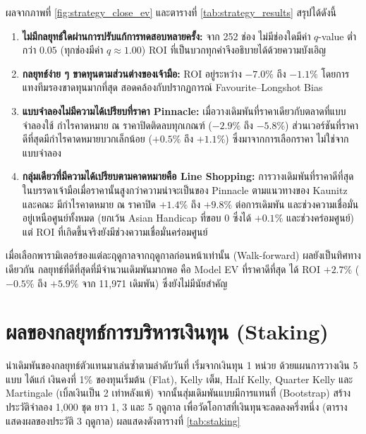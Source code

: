 ผลจากภาพที่ \ref{fig:strategy_close_ev} และตารางที่ \ref{tab:strategy_results} สรุปได้ดังนี้
\begin{enumerate}[label=\arabic*)]
    \item \textbf{ไม่มีกลยุทธ์ใดผ่านการปรับแก้การทดสอบหลายครั้ง:} จาก 252 ช่อง ไม่มีช่องใดมีค่า $q$-value ต่ำกว่า $0.05$ (ทุกช่องมีค่า $q \approx 1.00$) ROI ที่เป็นบวกทุกค่าจึงอธิบายได้ด้วยความบังเอิญ
    \item \textbf{กลยุทธ์ง่าย ๆ ขาดทุนตามส่วนต่างของเจ้ามือ:} ROI อยู่ระหว่าง $-7.0\%$ ถึง $-1.1\%$ โดยการแทงทีมรองขาดทุนมากที่สุด สอดคล้องกับปรากฏการณ์ Favourite--Longshot Bias
    \item \textbf{แบบจำลองไม่มีความได้เปรียบที่ราคา Pinnacle:} เมื่อวางเดิมพันที่ราคาเดียวกับตลาดที่แบบจำลองใช้ กำไรคาดหมาย ณ ราคาปิดติดลบทุกเกณฑ์ ($-2.9\%$ ถึง $-5.8\%$) ส่วนเวอร์ชันที่ราคาดีที่สุดมีกำไรคาดหมายบวกเล็กน้อย ($+0.5\%$ ถึง $+1.1\%$) ซึ่งมาจากการเลือกราคา ไม่ใช่จากแบบจำลอง
    \item \textbf{กลุ่มเดียวที่มีความได้เปรียบตามคาดหมายคือ Line Shopping:} การวางเดิมพันที่ราคาดีที่สุดในบรรดาเจ้ามือเมื่อราคานั้นสูงกว่าความน่าจะเป็นของ Pinnacle ตามแนวทางของ Kaunitz และคณะ \cite{kaunitz2017beating} มีกำไรคาดหมาย ณ ราคาปิด $+1.4\%$ ถึง $+9.8\%$ ต่อการเดิมพัน และช่วงความเชื่อมั่นอยู่เหนือศูนย์ทั้งหมด (ยกเว้น Asian Handicap ที่ขอบ $0$ ซึ่งได้ $+0.1\%$ และช่วงคร่อมศูนย์) แต่ ROI ที่เกิดขึ้นจริงยังมีช่วงความเชื่อมั่นคร่อมศูนย์
\end{enumerate}

เมื่อเลือกพารามิเตอร์ของแต่ละฤดูกาลจากฤดูกาลก่อนหน้าเท่านั้น (Walk-forward) ผลยังเป็นทิศทางเดียวกัน กลยุทธ์ที่ดีที่สุดที่มีจำนวนเดิมพันมากพอ คือ Model EV ที่ราคาดีที่สุด ได้ ROI $+2.7\%$ ($-0.5\%$ ถึง $+5.9\%$ จาก 11,971 เดิมพัน) ซึ่งยังไม่มีนัยสำคัญ

\section{ผลของกลยุทธ์การบริหารเงินทุน (Staking)}

นำเดิมพันของกลยุทธ์ตัวแทนมาเล่นซ้ำตามลำดับวันที่ เริ่มจากเงินทุน 1 หน่วย ด้วยแผนการวางเงิน 5 แบบ ได้แก่ เงินคงที่ 1\% ของทุนเริ่มต้น (Flat), Kelly เต็ม, Half Kelly, Quarter Kelly และ Martingale (เบิ้ลเงินเป็น 2 เท่าหลังแพ้) จากนั้นสุ่มเดิมพันแบบมีการแทนที่ (Bootstrap) สร้างประวัติจำลอง 1,000 ชุด ยาว 1, 3 และ 5 ฤดูกาล เพื่อวัดโอกาสที่เงินทุนจะลดลงครึ่งหนึ่ง (ตารางแสดงผลของประวัติ 3 ฤดูกาล) ผลแสดงดังตารางที่ \ref{tab:staking}

